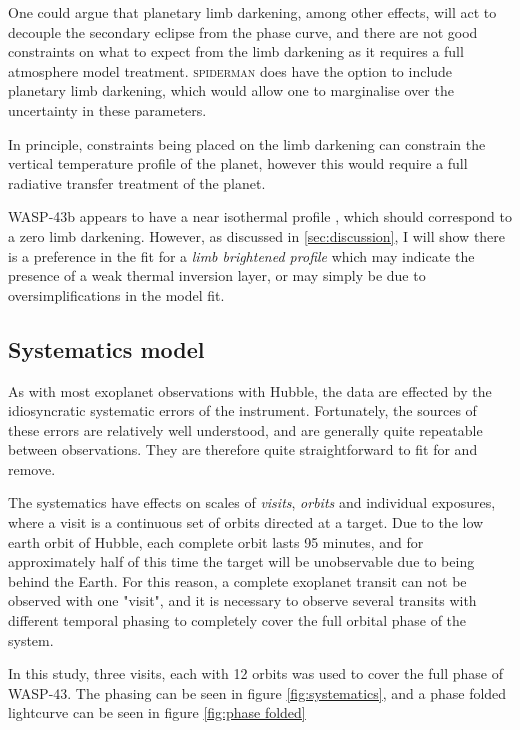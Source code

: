\documentclass[a4paper,fleqn,usenatbib]{mnras}
\begin{document}
One could argue that planetary limb darkening, among other effects, will act to decouple the secondary eclipse from the phase curve, and there are not good constraints on what to expect from the limb darkening as it requires a full atmosphere model treatment. \textsc{spiderman} does have the option to include planetary limb darkening, which would allow one to marginalise over the uncertainty in these parameters. 

In principle, constraints being placed on the limb darkening can constrain the vertical temperature profile of the planet, however this would require a full radiative transfer treatment of the planet.

WASP-43b appears to have a near isothermal profile \citep{Stevenson2014}, which should correspond to a zero limb darkening. However, as discussed in \ref{sec:discussion}, I will show there is a preference in the fit for a \emph{limb brightened profile} which may indicate the presence of a weak thermal inversion layer, or may simply be due to oversimplifications in the model fit.

\subsection{Systematics model}\label{sec:systematics}

As with most exoplanet observations with Hubble, the data are effected by the idiosyncratic systematic errors of the instrument. Fortunately, the sources of these errors are relatively well understood, and are generally quite repeatable between observations. They are therefore quite straightforward to fit for and remove. 

The systematics have effects on scales of \emph{visits}, \emph{orbits} and individual exposures, where a visit is a continuous set of orbits directed at a target. Due to the low earth orbit of Hubble, each complete orbit lasts 95 minutes, and for approximately half of this time the target will be unobservable due to being behind the Earth. For this reason, a complete exoplanet transit can not be observed with one "visit", and it is necessary to observe several transits with different temporal phasing to completely cover the full orbital phase of the system.

In this study, three visits, each with 12 orbits was used to cover the full phase of WASP-43. The phasing can be seen in figure \ref{fig:systematics}, and a phase folded lightcurve can be seen in figure \ref{fig:phase folded}
\end{document}
